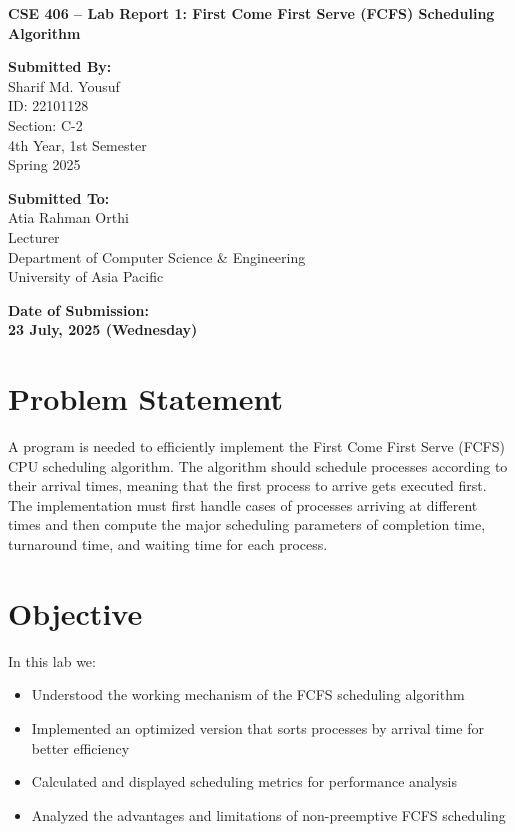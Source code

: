 \documentclass[12pt,a4paper]{article}
\begin{document}
\begin{titlepage}
  \centering
  \vspace*{3cm}

  {\Huge\bfseries CSE 406 – Lab Report 1: First Come First Serve (FCFS) Scheduling Algorithm \par}
  \vspace{2.5cm}

  \noindent
  \begin{minipage}[t]{0.48\textwidth}
    {\large\bfseries Submitted By:}\\[0.5em]
    \Large
    Sharif Md. Yousuf \\
    ID: 22101128 \\
    Section: C-2 \\
    4th Year, 1st Semester \\
    Spring 2025
  \end{minipage}
  \hfill
  \begin{minipage}[t]{0.48\textwidth}
    {\large\bfseries Submitted To:}\\[0.5em]
    \Large
    Atia Rahman Orthi \\
    Lecturer \\
    Department of Computer Science \& Engineering \\
    University of Asia Pacific
  \end{minipage}

  \vfill

  {\Large\bfseries Date of Submission:} \\[0.5em]
  {\LARGE\bfseries 23 July, 2025 (Wednesday)}

  \vspace*{2cm}
\end{titlepage}

\section{Problem Statement}
A program is needed to efficiently implement the First Come First Serve (FCFS) CPU scheduling algorithm. The algorithm should schedule processes according to their arrival times, meaning that the first process to arrive gets executed first. The implementation must first handle cases of processes arriving at different times and then compute the major scheduling parameters of completion time, turnaround time, and waiting time for each process.

\section{Objective}
In this lab we:
\begin{itemize}
    \item Understood the working mechanism of the FCFS scheduling algorithm
    \item Implemented an optimized version that sorts processes by arrival time for better efficiency
    \item Calculated and displayed scheduling metrics for performance analysis
    \item Analyzed the advantages and limitations of non-preemptive FCFS scheduling
\end{itemize}
\end{document}
